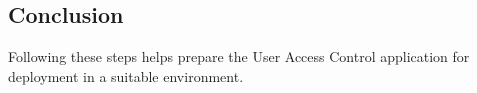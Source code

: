 \documentclass[letterpaper,10pt,english]{sphinxmanual}
\begin{document}
\subsection{Conclusion}
\label{\detokenize{deployment:conclusion}}
\sphinxAtStartPar
Following these steps helps prepare the User Access Control application
for deployment in a suitable environment.


\renewcommand{\indexname}{Python Module Index}
\begin{sphinxtheindex}
\let\bigletter\sphinxstyleindexlettergroup
\bigletter{a}
\item\relax{}
\item\relax{}
\item\relax{}
\item\relax{}
\item\relax{}
\item\relax{}
\end{sphinxtheindex}

\renewcommand{\indexname}{Index}
\printindex
\end{document}
